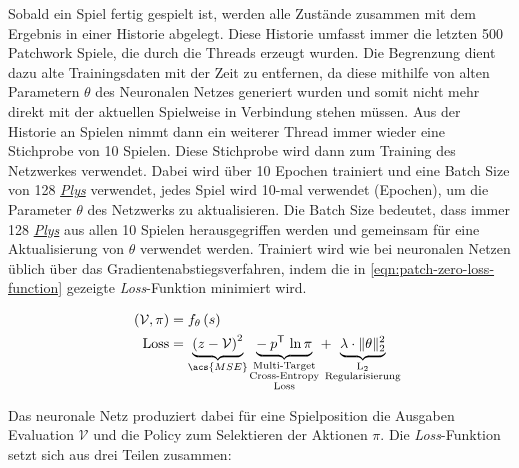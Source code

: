 Sobald ein Spiel fertig gespielt ist, werden alle Zustände zusammen mit dem Ergebnis in einer Historie abgelegt. Diese Historie umfasst immer die letzten 500 Patchwork Spiele, die durch die Threads erzeugt wurden. Die Begrenzung dient dazu alte Trainingsdaten mit der Zeit zu entfernen, da diese mithilfe von alten Parametern $\theta$ des Neuronalen Netzes generiert wurden und somit nicht mehr direkt mit der aktuellen Spielweise in Verbindung stehen müssen. Aus der Historie an Spielen nimmt dann ein weiterer Thread immer wieder eine Stichprobe von 10 Spielen. Diese Stichprobe wird dann zum Training des Netzwerkes verwendet. Dabei wird über 10 Epochen trainiert und eine Batch Size von 128 \hyperref[text:ply]{\emph{Plys}} verwendet, \dash jedes Spiel wird 10-mal verwendet (Epochen), um die Parameter $\theta$ des Netzwerks zu aktualisieren. Die Batch Size bedeutet, dass immer 128 \hyperref[text:ply]{\emph{Plys}} aus allen 10 Spielen herausgegriffen werden und gemeinsam für eine Aktualisierung von $\theta$ verwendet werden.  Trainiert wird wie bei neuronalen Netzen üblich über das Gradientenabstiegsverfahren, indem die in \ref{eqn:patch-zero-loss-function} gezeigte \emph{Loss}-Funktion minimiert wird.

\begin{align}
    \label{eqn:patch-zero-network-output}
    (\mathcal{V}, \pi) &= f_\theta\left(s\right) \\
    \label{eqn:patch-zero-loss-function}
    \text{Loss} &= \underbrace{\left(z - \mathcal{V}\right)^2}_{\acs{MSE}}\:\,\mspace{1mu} \underbrace{-\: p^\mathsf{T}\, \ln \pi}_{\mathclap{\substack{\text{Multi-Target}\\ \text{Cross-Entropy}\\ \text{Loss}}}}\:\,\mspace{1mu} +\:\,\mspace{1mu} \underbrace{\lambda \cdot \lVert \theta\rVert _2^2}_{\mathclap{\substack{\text{L}_2 \\ \text{Regularisierung}}}}
\end{align}
\vspace*{-0.2cm}

Das neuronale Netz produziert dabei für eine Spielposition die Ausgaben Evaluation $\mathcal{V}$ und die Policy zum Selektieren der Aktionen $\pi$. Die \emph{Loss}-Funktion setzt sich aus drei Teilen zusammen:

